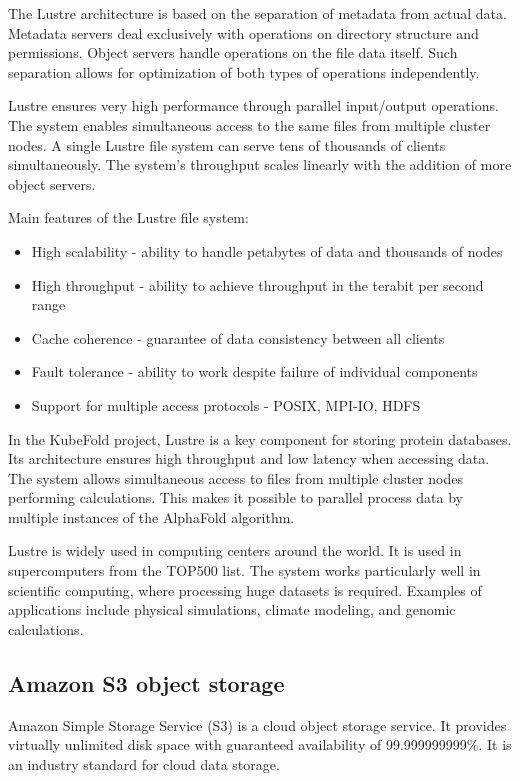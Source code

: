 The Lustre architecture is based on the separation of metadata from actual data.
Metadata servers deal exclusively with operations on directory structure and permissions.
Object servers handle operations on the file data itself.
Such separation allows for optimization of both types of operations independently.

Lustre ensures very high performance through parallel input/output operations.
The system enables simultaneous access to the same files from multiple cluster nodes.
A single Lustre file system can serve tens of thousands of clients simultaneously.
The system's throughput scales linearly with the addition of more object servers.

Main features of the Lustre file system:
\begin{itemize}
    \item High scalability - ability to handle petabytes of data and thousands of nodes
    \item High throughput - ability to achieve throughput in the terabit per second range
    \item Cache coherence - guarantee of data consistency between all clients
    \item Fault tolerance - ability to work despite failure of individual components
    \item Support for multiple access protocols - POSIX, MPI-IO, HDFS
\end{itemize}

In the KubeFold project, Lustre is a key component for storing protein databases.
Its architecture ensures high throughput and low latency when accessing data.
The system allows simultaneous access to files from multiple cluster nodes performing calculations.
This makes it possible to parallel process data by multiple instances of the AlphaFold algorithm.

Lustre is widely used in computing centers around the world.
It is used in supercomputers from the TOP500 list.
The system works particularly well in scientific computing, where processing huge datasets is required.
Examples of applications include physical simulations, climate modeling, and genomic calculations.

\subsection{Amazon S3 object storage}

Amazon Simple Storage Service (S3) is a cloud object storage service.
It provides virtually unlimited disk space with guaranteed availability of 99.999999999\%.
It is an industry standard for cloud data storage.

